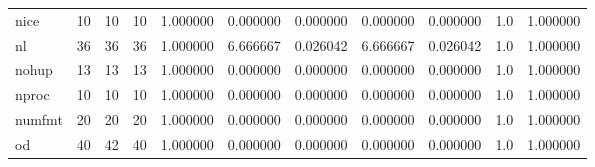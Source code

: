\begin{longtable}{lrrrrrrrrrr}
nice      &                                      10 &                 10 &                                10 &                                   1.000000 &                               0.000000 &                                     0.000000 &                          0.000000 &                                0.000000 &                                1.0 &                                           1.000000 \\
nl        &                                      36 &                 36 &                                36 &                                   1.000000 &                               6.666667 &                                     0.026042 &                          6.666667 &                                0.026042 &                                1.0 &                                           1.000000 \\
nohup     &                                      13 &                 13 &                                13 &                                   1.000000 &                               0.000000 &                                     0.000000 &                          0.000000 &                                0.000000 &                                1.0 &                                           1.000000 \\
nproc     &                                      10 &                 10 &                                10 &                                   1.000000 &                               0.000000 &                                     0.000000 &                          0.000000 &                                0.000000 &                                1.0 &                                           1.000000 \\
numfmt    &                                      20 &                 20 &                                20 &                                   1.000000 &                               0.000000 &                                     0.000000 &                          0.000000 &                                0.000000 &                                1.0 &                                           1.000000 \\
od        &                                      40 &                 42 &                                40 &                                   1.000000 &                               0.000000 &                                     0.000000 &                          0.000000 &                                0.000000 &                                1.0 &                                           1.000000 \\

\end{longtable}
